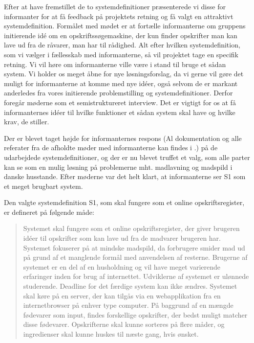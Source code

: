 Efter at have fremstillet de to systemdefinitioner præsenterede vi disse for informanter for at få feedback på projektets retning og få valgt en attraktivt systemdefinition. Formålet med mødet er at fortælle informanterne om gruppens initierende idé om en opskriftssøgemaskine, der kun finder opskrifter man kan lave ud fra de råvarer, man har til rådighed. Alt efter hvilken systemdefinition, som vi vælger i fællesskab med informanterne, så vil projektet tage en specifik retning. Vi vil høre om informanterne ville være i stand til bruge et sådan system. Vi holder os meget åbne for nye løsningsforslag, da vi gerne vil gøre det muligt for informanterne at komme med nye idéer, også selvom de er markant anderledes fra vores initierende problemstilling og systemdefinitioner. Derfor foregår møderne som et semistruktureret interview. Det er vigtigt for os at få informanternes idéer til hvilke funktioner et sådan system skal have og hvilke krav, de stiller.

Der er blevet taget højde for informanternes respons (Al dokumentation og alle referater fra de afholdte møder med informanterne kan findes i .) på de udarbejdede systemdefinitioner, og der er nu blevet truffet et valg, som alle parter kan se som en mulig løsning på problemerne mht. madlavning og madspild i danske husstande. Efter møderne var det helt klart, at informanterne ser S1 som et meget brugbart system. 

Den valgte systemdefinition S1, som skal fungere som et online opskriftsregister, er defineret på følgende måde:

\begin{quote}
Systemet skal fungere som et online opskriftsregister, der giver brugeren idéer til opskrifter som kan lave ud fra de madvarer brugeren har. Systemet fokuserer på at mindske madspild, da forbrugere smider mad ud på grund af et manglende formål med anvendelsen af resterne. Brugerne af systemet er en del af en husholdning og vil have meget varierende erfaringer inden for brug af internettet. Udviklerne af systemet er ulønnede studerende. Deadline for det færdige system kan ikke ændres. Systemet skal køre på en server, der kan tilgås via en webapplikation fra en internetbrowser på enhver type computer. På baggrund af en mængde fødevarer som input, findes forskellige opskrifter, der bedst muligt matcher disse fødevarer. Opskrifterne skal kunne sorteres på flere måder, og ingredienser skal kunne huskes til næste gang, hvis ønsket.
\end{quote}

